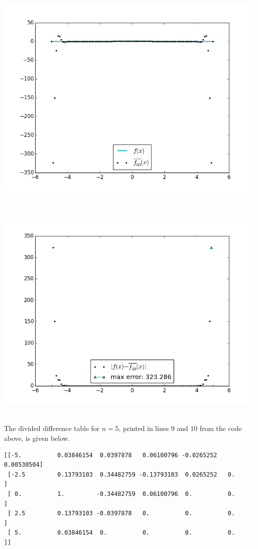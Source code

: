 \documentclass[12pt]{article}
\begin{document}
\centerline{\includegraphics[scale=0.65]{figures/problem4_d_030points.png}}\\
\centerline{\includegraphics[scale=0.65]{figures/problem4_e_030points.png}}\\
The divided difference table for $n=5$, printed in lines 9 and 10 from the code above, is given below.
\begin{verbatim}
[[-5.          0.03846154  0.0397878   0.06100796 -0.0265252   0.00530504]
 [-2.5         0.13793103  0.34482759 -0.13793103  0.0265252   0.        ]
 [ 0.          1.         -0.34482759  0.06100796  0.          0.        ]
 [ 2.5         0.13793103 -0.0397878   0.          0.          0.        ]
 [ 5.          0.03846154  0.          0.          0.          0.        ]]
\end{verbatim}
\end{document}

